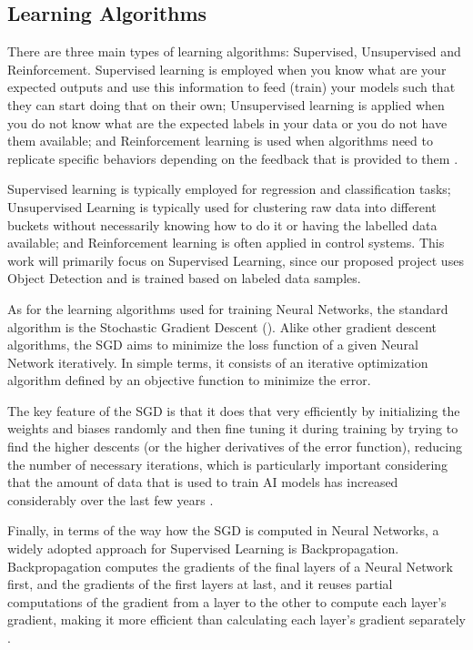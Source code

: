 \documentclass[openright]{normas-utf-tex} %
\begin{document}
\subsection{Learning Algorithms}

There are three main types of learning algorithms: Supervised, Unsupervised and Reinforcement.
Supervised learning is employed when you know what are your expected outputs and use this
information to feed (train) your models such that they can start doing that on their own; 
Unsupervised learning is applied when you do not know what are the expected labels 
in your data or you do not have them available; and Reinforcement learning is used when
algorithms need to replicate specific behaviors depending on the feedback that is
provided to them \cite{CourseraML}. 

Supervised learning is typically employed for regression and classification tasks; 
Unsupervised Learning is typically used for clustering raw data into different buckets
without necessarily knowing how to do it or having the labelled data available;
and Reinforcement learning is often applied in control systems.
This work will primarily focus on Supervised Learning, since our proposed project uses
Object Detection and is trained based on labeled data samples.

As for the learning algorithms used for training Neural Networks, 
the standard algorithm is the Stochastic Gradient Descent ().
Alike other gradient descent algorithms, the SGD aims to minimize the loss function of a given
Neural Network iteratively. In simple terms, it consists of an iterative optimization algorithm defined by an
objective function to minimize the error.

The key feature of the SGD is that it does that very efficiently by initializing the weights
and biases randomly and then fine tuning it during training by trying to find the higher descents 
(or the higher derivatives of the error function), reducing the number of necessary iterations, 
which is particularly important considering that the amount of data that is used to train AI
models has increased considerably over the last few years \cite{CornellSGD}.

Finally, in terms of the way how the SGD is computed in Neural Networks, a widely adopted approach 
for Supervised Learning is Backpropagation. Backpropagation computes the gradients of the final 
layers of a Neural Network first, and the gradients of the first layers at last, 
and it reuses partial computations of the gradient from a layer to the other to compute each layer's 
gradient, making it more efficient than calculating each layer's gradient separately \cite{BrilliantBackpropagation}. 
\end{document}
